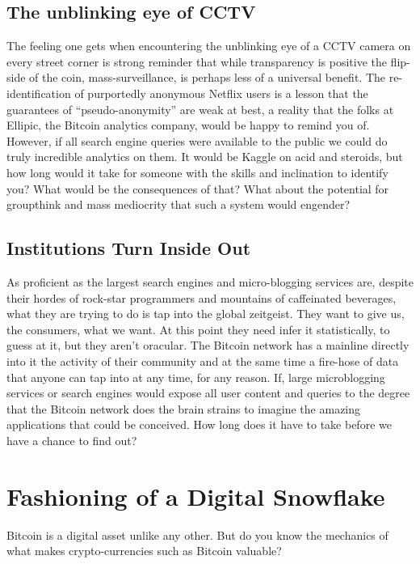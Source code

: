 \subsection*{The unblinking eye of CCTV}

The feeling one gets when encountering the unblinking eye of a CCTV camera on every street corner is strong reminder that while transparency is positive the flip-side of the coin, mass-surveillance, is perhaps less of a universal benefit.
The re-identification of purportedly anonymous Netflix users is a lesson that the guarantees of ``pseudo-anonymity'' are weak at best, a reality that the folks at Ellipic, the Bitcoin analytics company, would be happy to remind you of.
However, if all search engine queries were available to the public we could do truly incredible analytics on them. 
It would be Kaggle on acid and steroids, but how long would it take for someone with the skills and inclination to identify you? What would be the consequences of that? 
What about the potential for groupthink and mass mediocrity that such a system would engender?

\subsection*{Institutions Turn Inside Out}

As proficient as the largest search engines and micro-blogging services are, despite their hordes of rock-star programmers and mountains of caffeinated beverages, what they are trying to do is tap into the global zeitgeist. 
They want to give us, the consumers, what we want. At this point they need infer it statistically, to guess at it, but they aren't oracular. 
The Bitcoin network has a mainline directly into it the activity of their community and at the same time a fire-hose of data that anyone can tap into at any time, for any reason. 
If, large microblogging services or search engines would expose all user content and queries to the degree that the Bitcoin network does the brain strains to imagine the amazing applications that could be conceived. 
How long does it have to take before we have a chance to find out?

\section{Fashioning of a Digital Snowflake}

Bitcoin is a digital asset unlike any other. 
But do you know the mechanics of what makes crypto-currencies such as Bitcoin valuable?

